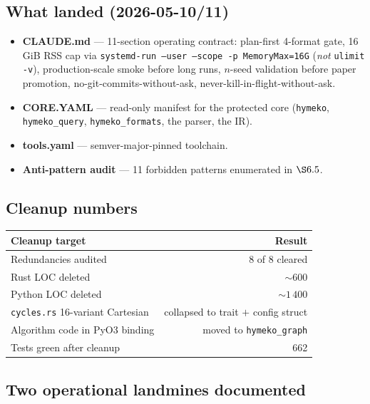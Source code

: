 \documentclass[11pt,a4paper]{article}
\newcommand{\code}[1]{\texttt{\small #1}}
\begin{document}
\subsection{What landed (2026-05-10/11)}

\begin{itemize}
  \item \textbf{CLAUDE.md} --- 11-section operating contract: plan-first
        4-format gate, 16 GiB RSS cap via \code{systemd-run --user
        --scope -p MemoryMax=16G} (\emph{not} \code{ulimit -v}),
        production-scale smoke before long runs, $n$-seed validation
        before paper promotion, no-git-commits-without-ask,
        never-kill-in-flight-without-ask.
  \item \textbf{CORE.YAML} --- read-only manifest for the protected core
        (\code{hymeko}, \code{hymeko\_query}, \code{hymeko\_formats},
        the parser, the IR).
  \item \textbf{tools.yaml} --- semver-major-pinned toolchain.
  \item \textbf{Anti-pattern audit} --- 11 forbidden patterns enumerated
        in $\S 6.5$.
\end{itemize}

\subsection{Cleanup numbers}

\begin{center}\small
\begin{tabular}{lr}
\toprule
Cleanup target & Result \\
\midrule
Redundancies audited                                & 8 of 8 cleared \\
Rust LOC deleted                                    & ${\sim}600$ \\
Python LOC deleted                                  & ${\sim}1\,400$ \\
\code{cycles.rs} 16-variant Cartesian               & collapsed to trait $+$ config struct \\
Algorithm code in PyO3 binding                      & moved to \code{hymeko\_graph} \\
Tests green after cleanup                           & 662 \\
\bottomrule
\end{tabular}
\end{center}

\subsection{Two operational landmines documented}
\end{document}
